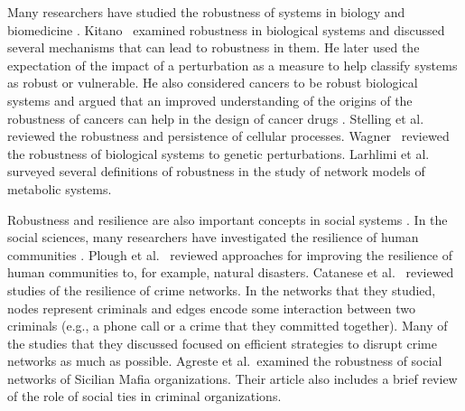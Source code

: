 \documentclass{comnet-mod}
\begin{document}
Many researchers have studied the robustness of systems in biology and biomedicine \cite{Kitano2004, Kitano2004a, Stelling2004, Kitano2007, Kitano2007a, Wagner2007, Larhlimi2011}.
Kitano~\cite{Kitano2004} examined robustness in biological systems and discussed several mechanisms that can lead to robustness in them. He later used the expectation of the impact of a perturbation \cite{Kitano2007} as a measure to help classify systems as robust or vulnerable. He also considered cancers to be robust biological systems \cite{Kitano2004a} and argued that an improved understanding of the origins of the robustness of cancers can help in the design of cancer drugs \cite{Kitano2007a}. Stelling et al.~\cite{Stelling2004}  reviewed the robustness and persistence of cellular processes. Wagner~\cite{Wagner2007} reviewed the robustness of biological systems to genetic perturbations. Larhlimi et al.~\cite{Larhlimi2011} surveyed several definitions of robustness in the study of network models of metabolic systems.

Robustness and resilience are also important concepts in social systems \cite{Tobin1999, Cutter2008, Magis2010, Berkes2013, Plough2013, Agreste2016, Catanese2016}. In the social sciences, many researchers have investigated the resilience of human communities \cite{Tobin1999, Cutter2008, Magis2010, Berkes2013}. Plough et al.~\cite{Plough2013} reviewed approaches for improving the resilience of human communities to, for example, natural disasters. Catanese et al.~\cite{Catanese2016} reviewed studies of the resilience of crime networks. In the networks that they studied, nodes represent criminals and edges encode some interaction between two criminals (e.g., a phone call or a crime that they committed together). Many of the studies that they discussed focused on efficient strategies to disrupt crime networks as much as possible. Agreste et al.~\cite{Agreste2016}examined the robustness of social networks of Sicilian Mafia organizations. Their article also includes a brief review of the role of social ties in criminal organizations.
\end{document}

